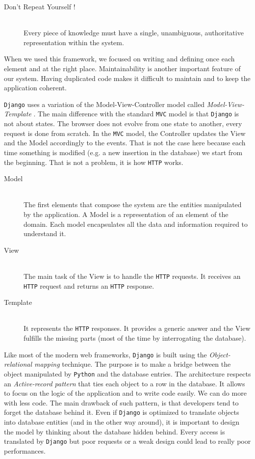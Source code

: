 \begin{description}
  \item[Don't Repeat Yourself !] \hfill \\
  Every piece of knowledge must have a single, unambiguous, authoritative representation within the system.
\end{description}

When we used this framework, we focused on writing and defining once each element and at the right place. Maintainability is another important feature of our system. Having duplicated code makes it difficult to maintain and to keep the application coherent.

\texttt{Django} uses a variation of the Model-View-Controller model called \emph{Model-View-Template} \cite{mvt}. The main difference with the standard \texttt{MVC} model is that \texttt{Django} is not about states. The browser does not evolve from one state to another, every request is done from scratch. In the \texttt{MVC} model, the Controller updates the View and the Model accordingly to the events. That is not the case here because each time something is modified (e.g. a new insertion in the database) we start from the beginning. That is not a problem, it is how \texttt{HTTP} works.

\begin{description}
\item[Model] \hfill \\
The first elements that compose the system are the entities manipulated by the application. A Model is a representation of an element of the domain. Each model encapsulates all the data and information required to understand it.

\item[View] \hfill \\
The main task of the View is to handle the \texttt{HTTP} requests. It receives an \texttt{HTTP} request and returns an \texttt{HTTP} response.

\item[Template] \hfill \\
It represents the \texttt{HTTP} responses. It provides a generic answer and the View fulfills the missing parts (most of the time by interrogating the database).
\end{description}

Like most of the modern web frameworks, \texttt{Django} is built using the \emph{Object-relational mapping} technique. The purpose is to make a bridge between the object manipulated by \texttt{Python} and the database entries. The architecture respects an \emph{Active-record pattern} that ties each object to a row in the database. It allows to focus on the logic of the application and to write code easily. We can do more with less code. The main drawback of such pattern, is that developers tend to forget the database behind it. Even if \texttt{Django} is optimized to translate objects into database entities (and in the other way around), it is important to design the model by thinking about the database hidden behind. Every access is translated by \texttt{Django} but poor requests or a weak design could lead to really poor performances.

